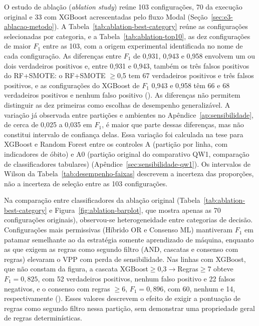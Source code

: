 O estudo de ablação (\textit{ablation study}) reúne 103 configurações, 70 da execução original e 33 com XGBoost acrescentadas pelo fluxo Modal (Seção~\ref{sec:e3-ablacao-metodo}). A Tabela~\ref{tab:ablation-best-category} reúne as configurações selecionadas por categoria, e a Tabela~\ref{tab:ablation-top10}, as dez configurações de maior $F_1$ entre as 103, com a origem experimental identificada no nome de cada configuração. As diferenças entre $F_1$ de 0,931, 0,943 e 0,958 envolvem um ou dois verdadeiros positivos e, entre 0,931 e 0,943, também os três falsos positivos do RF+SMOTE: o RF+SMOTE $\geq$0,5 tem 67 verdadeiros positivos e três falsos positivos, e as configurações do XGBoost de $F_1$ 0,943 e 0,958 têm 66 e 68 verdadeiros positivos e nenhum falso positivo (). As diferenças não permitem distinguir as dez primeiras como escolhas de desempenho generalizável. A variação já observada entre partições e ambientes no Apêndice~\ref{ap:sensibilidade}, de cerca de 0,025 a 0,035 em $F_1$, é maior que parte dessas diferenças, mas não constitui intervalo de confiança delas. Essa variação foi calculada na tese para XGBoost e Random Forest entre os controles A (partição por linha, com indicadores de óbito) e A0 (partição original do comparativo QW1, comparação de classificadores tabulares) (Apêndice~\ref{sec:sensibilidade-qw1}). Os intervalos de Wilson da Tabela~\ref{tab:desempenho-faixas} descrevem a incerteza das proporções, não a incerteza de seleção entre as 103 configurações.





Na comparação entre classificadores da ablação original (Tabela~\ref{tab:ablation-best-category} e Figura~\ref{fig:ablation-barplot}, que mostra apenas as 70 configurações originais), observou-se heterogeneidade entre categorias de decisão. Configurações mais permissivas (Híbrido OR e Consenso ML) mantiveram $F_1$ em patamar semelhante ao da estratégia somente aprendizado de máquina, enquanto as que exigem as regras como segundo filtro (AND, cascatas e consenso com regras) elevaram o VPP com perda de sensibilidade. Nas linhas com XGBoost, que não constam da figura, a cascata XGBoost$\geq$0,3$\rightarrow$Regras$\geq$7 obteve $F_1=0{,}825$, com 52 verdadeiros positivos, nenhum falso positivo e 22 falsos negativos, e o consenso com regras $\geq 6$, $F_1=0{,}896$, com 60, nenhum e 14, respectivamente (). Esses valores descrevem o efeito de exigir a pontuação de regras como segundo filtro nessa partição, sem demonstrar uma propriedade geral de regras determinísticas.

